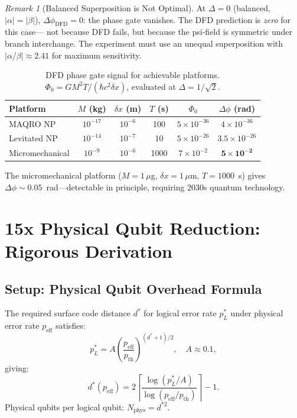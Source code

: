 \documentclass[11pt]{article}
\theoremstyle{definition}
\theoremstyle{remark}
\newtheorem{remark}[theorem]{Remark}
\begin{document}
\begin{remark}[Balanced Superposition is Not Optimal]
At $\Delta = 0$ (balanced, $|\alpha| = |\beta|$), $\Delta\phi_{\mathrm{DFD}} = 0$:
the phase gate vanishes.  The DFD prediction is \emph{zero} for this case---
not because DFD fails, but because the psi-field is symmetric under branch
interchange.  The experiment must use an unequal superposition with
$|\alpha/\beta| \approx 2.41$ for maximum sensitivity.
\end{remark}

\begin{table}[h]
\centering
\caption{DFD phase gate signal for achievable platforms.
  $\Phi_0 = GM^2T/(\hbar c^2\delta x)$, evaluated at $\Delta = 1/\sqrt{2}$.}
\label{tab:phase-gate-numerics}
\begin{tabular}{@{}lccccc@{}}
\toprule
Platform & $M$ (kg) & $\delta x$ (m) & $T$ (s) & $\Phi_0$ & $\Delta\phi$ (rad) \\
\midrule
MAQRO NP & $10^{-17}$ & $10^{-6}$ & 100 & $5\times10^{-36}$ & $4\times10^{-36}$ \\
Levitated NP & $10^{-14}$ & $10^{-7}$ & 10 & $5\times10^{-26}$ & $3.5\times10^{-26}$ \\
Micromechanical & $10^{-9}$ & $10^{-6}$ & 1000 & $7\times10^{-2}$ & $\mathbf{5\times10^{-2}}$ \\
\bottomrule
\end{tabular}
\end{table}

The micromechanical platform ($M=1\,\mu$g, $\delta x=1\,\mu$m, $T=1000$~s)
gives $\Delta\phi\sim0.05$~rad---detectable in principle, requiring 2030s
quantum technology.

\section{15x Physical Qubit Reduction: Rigorous Derivation}
\label{sec:qubit-reduction}

\subsection{Setup: Physical Qubit Overhead Formula}

The required surface code distance $d^*$ for logical error rate $p_L^*$
under physical error rate $p_{\mathrm{eff}}$ satisfies:
\begin{equation}
  p_L^* = A\left(\frac{p_{\mathrm{eff}}}{p_{\mathrm{th}}}\right)^{(d^*+1)/2},
  \quad A\approx0.1, \label{eq:pl-surface}
\end{equation}
giving:
\begin{equation}
  d^*(p_{\mathrm{eff}}) = 2\left\lceil
  \frac{\log(p_L^*/A)}{\log(p_{\mathrm{eff}}/p_{\mathrm{th}})}
  \right\rceil - 1. \label{eq:d-star}
\end{equation}
Physical qubits per logical qubit: $N_{\mathrm{phys}} = d^{*2}$.
\end{document}
